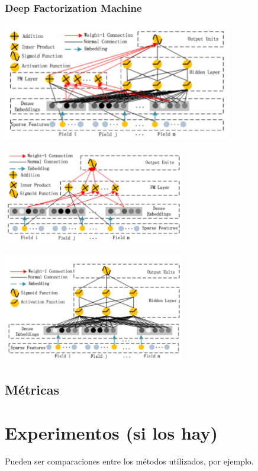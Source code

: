 \documentclass[11pt,a4paper,twoside]{thesis}
\begin{document}
\subsection{Deep Factorization Machine}


\begin{center}
	\includegraphics[width=10cm]{./images/DeepFM.png}
\end{center}


\begin{center}
	\includegraphics[width=8cm]{./images/DFM-FM-Component.png}
\end{center}

\begin{center}
	\includegraphics[width=8cm]{./images/DFM-Deep-Component.png}
\end{center}


\section{Métricas}


\chapter{Experimentos (si los hay)}
Pueden ser comparaciones entre los métodos utilizados, por ejemplo. 
\end{document}
